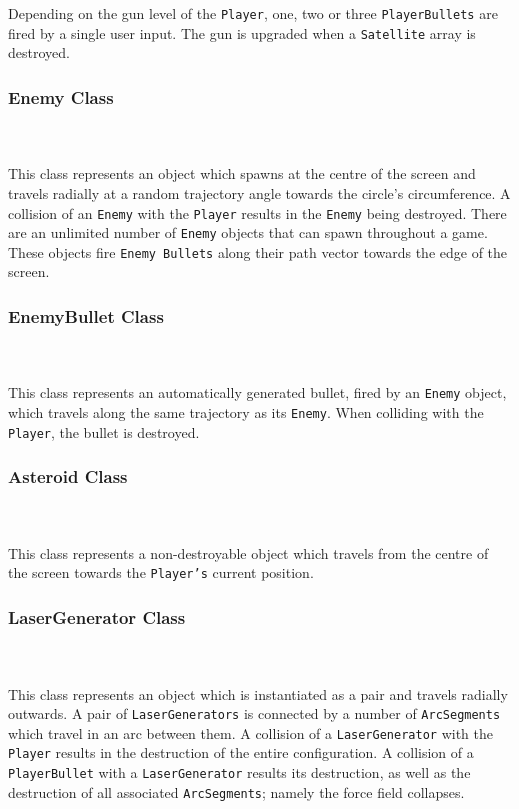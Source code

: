 \documentclass[10pt,twocolumn]{witseiepaper}
\begin{document}
Depending on the gun level of the \texttt{Player}, one, two or three \texttt{PlayerBullets} are fired by a single user input. The gun is upgraded when a \texttt{Satellite} array is destroyed. 

\subsubsection{Enemy Class}
~\\
~\\
This class represents an object which spawns at the centre of the screen and travels radially at a random trajectory angle towards the circle's circumference. A collision of an \texttt{Enemy} with the \texttt{Player} results in the \texttt{Enemy} being destroyed. There are an unlimited number of \texttt{Enemy} objects that can spawn throughout a game. These objects fire \texttt{Enemy Bullets} along their path vector towards the edge of the screen.

\subsubsection{EnemyBullet Class}
~\\
~\\
This class represents an automatically generated bullet, fired by an \texttt{Enemy} object, which travels along the same trajectory as its \texttt{Enemy}. When colliding with the \texttt{Player}, the bullet is destroyed.

\subsubsection{Asteroid Class}
~\\
~\\
This class represents a non-destroyable object which travels from the centre of the screen towards the \texttt{Player's} current position.

\subsubsection{LaserGenerator Class}
~\\
~\\
This class represents an object which is instantiated as a pair and travels radially outwards. A pair of \texttt{LaserGenerators} is connected by a number of \texttt{ArcSegments} which travel in an arc between them. A collision of a \texttt{LaserGenerator} with the \texttt{Player} results in the destruction of the entire configuration. A collision of a \texttt{PlayerBullet} with a \texttt{LaserGenerator} results its destruction, as well as the destruction of all associated \texttt{ArcSegments}; namely the force field collapses.
\end{document}
